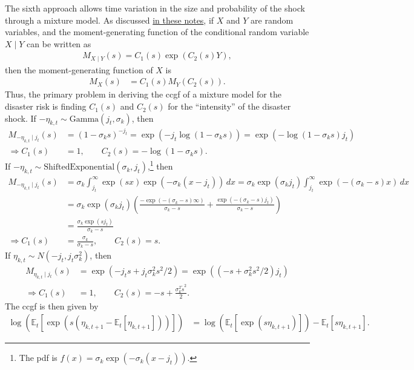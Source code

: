 \documentclass[12 pt, oneside]{article}
\theoremstyle{definition}
\theoremstyle{definition}
\theoremstyle{definition}
\newcommand{\E}{\mathbb{E}}
\newcommand{\RA}{\Rightarrow}
\begin{document}
The sixth approach allows time variation in the size and probability of the shock through a mixture model. As discussed \href{https://chenwilliam77.github.io/RiskAdjustedLinearizations.jl/stable/tips/\#ccgf-tips-1}{in these notes}, if $X$ and $Y$ are random variables, and the moment-generating function of the conditional random variable $X\mid Y$ can be written as
\begin{align*}
  M_{X \mid Y}(s) = C_1(s) \exp(C_2(s) Y),
\end{align*}
then the moment-generating function of $X$ is
\begin{align*}
  M_X(s) & = C_1(s) M_Y(C_2(s)).
\end{align*}
Thus, the primary problem in deriving the ccgf of a mixture model for the disaster risk is finding $C_1(s)$ and $C_2(s)$ for the ``intensity'' of the disaster shock. If $-\eta_{k, t} \sim \text{Gamma}(j_t, \sigma_k)$, then
\begin{align*}
  M_{-\eta_{k, t} \mid j_t}(s) & = (1 - \sigma_k s)^{-j_t} = \exp(-j_t\log(1 - \sigma_k s)) = \exp(-\log(1 - \sigma_k s) j_t)\\
\RA  C_1(s) & = 1,\quad \quad C_2(s) = -\log(1 - \sigma_k s).
\end{align*}
If $-\eta_{k, t} \sim \text{ShiftedExponential}(\sigma_k, j_t)$,\footnote{The pdf is $f(x) = \sigma_k \exp( - \sigma_k(x - j_t))$.} then
\begin{align*}
  M_{-\eta_{k, t} \mid j_t}(s) & = \sigma_k\int_{j_t}^\infty \exp(s x)\exp(-\sigma_k(x - j_t))\, dx = \sigma_k \exp(\sigma_kj_t)\int_{j_t}^\infty \exp(-(\sigma_k - s)x)\, dx\\
                               & = \sigma_k \exp(\sigma_k j_t)\left(\frac{-\exp(-(\sigma_k - s) \infty)}{\sigma_k - s} + \frac{\exp(-(\sigma_k - s) j_t)}{\sigma_k - s}\right)\\
                               & = \frac{\sigma_k \exp(s j_t)}{\sigma_k - s}\\
  \RA C_1(s) & = \frac{\sigma_k}{\sigma_k - s}, \quad\quad C_2(s) = s.
\end{align*}
If $\eta_{k, t} \sim N(-j_t, j_t \sigma_k^2)$, then
\begin{align*}
  M_{\eta_{k, t} \mid j_t}(s) & = \exp(-j_t  s + j_t \sigma_k^2 s^2  / 2) = \exp((-s + \sigma_k^2 s^2 / 2) j_t)\\
  \RA C_1(s) & = 1, \quad\quad C_2(s) = -s + \frac{\sigma_k^2\tilde{s}^2}{2}.
\end{align*}
The ccgf is then given by
\begin{align*}
  \log(\E_t[\exp(s (\eta_{k, t + 1} - \E_t[\eta_{k, t + 1}]))]) & = \log(\E_t[\exp(s \eta_{k, t + 1})]) - \E_t[s\eta_{k, t + 1}].
\end{align*}
\end{document}
